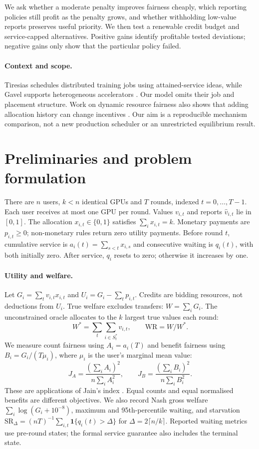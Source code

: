 \documentclass{article}
\newcommand{\WR}{\mathrm{WR}}
\newcommand{\SR}{\mathrm{SR}_{\Delta}}
\begin{document}
We ask whether a moderate penalty improves fairness cheaply, which reporting
policies still profit as the penalty grows, and whether withholding low-value
reports preserves useful priority. We then test a renewable credit budget and
service-capped alternatives. Positive gains identify profitable tested
deviations; negative gains only show that the particular policy failed.

\paragraph{Context and scope.}
Tiresias schedules distributed training jobs using attained-service ideas,
while Gavel supports heterogeneous accelerators
\cite{gu2019tiresias,narayanan2020heterogeneity}. Our model omits their job and
placement structure. Work on dynamic resource fairness also shows that adding
allocation history can change incentives \cite{fikioris2021incentives}.
Our aim is a reproducible mechanism comparison, not a new production scheduler
or an unrestricted equilibrium result.

\newpage
\section{Preliminaries and problem formulation}
There are $n$ users, $k<n$ identical GPUs and $T$ rounds, indexed
$t=0,\ldots,T-1$. Each user receives at most one GPU per round. Values
$v_{i,t}$ and reports $\hat v_{i,t}$ lie in $[0,1]$. The allocation
$x_{i,t}\in\{0,1\}$ satisfies $\sum_i x_{i,t}=k$. Monetary payments are
$p_{i,t}\ge0$; non-monetary rules return zero utility payments.
Before round $t$, cumulative service is $a_i(t)=\sum_{s<t}x_{i,s}$ and
consecutive waiting is $q_i(t)$, with both initially zero. After service,
$q_i$ resets to zero; otherwise it increases by one.

\paragraph{Utility and welfare.}
Let $G_i=\sum_t v_{i,t}x_{i,t}$ and $U_i=G_i-\sum_t p_{i,t}$.
Credits are bidding resources, not deductions from $U_i$.
True welfare excludes transfers: $W=\sum_i G_i$.
The unconstrained oracle allocates to the $k$ largest true values each round:
\[
 W^*=\sum_t\sum_{i\in S_t^*}v_{i,t},\qquad \WR=W/W^*.
\]
We measure count fairness using $A_i=a_i(T)$ and benefit fairness using
$B_i=G_i/(T\mu_i)$, where $\mu_i$ is the user's marginal mean value:
\[
 J_A=\frac{(\sum_i A_i)^2}{n\sum_i A_i^2},\qquad
 J_B=\frac{(\sum_i B_i)^2}{n\sum_i B_i^2}.
\]
These are applications of Jain's index \cite{jain1984quantitative}. Equal
counts and equal normalised benefits are different objectives.
We also record Nash gross welfare $\sum_i\log(G_i+10^{-8})$, maximum and
95th-percentile waiting, and starvation
$\SR=(nT)^{-1}\sum_{i,t}\mathbf1\{q_i(t)>\Delta\}$ for
$\Delta=2\lceil n/k\rceil$. Reported waiting metrics use pre-round states;
the formal service guarantee also includes the terminal state.
\end{document}
